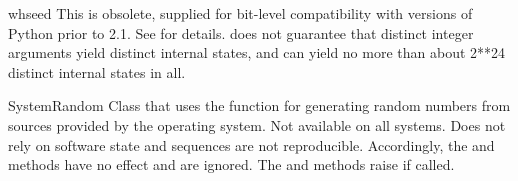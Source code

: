 \begin{funcdesc}{whseed}{}
  This is obsolete, supplied for bit-level compatibility with versions
  of Python prior to 2.1.
  See  for details.   does not guarantee
  that distinct integer arguments yield distinct internal states, and can
  yield no more than about 2**24 distinct internal states in all.
\end{funcdesc}

\begin{classdesc}{SystemRandom}{}
Class that uses the  function for generating
random numbers from sources provided by the operating system.
Not available on all systems.
Does not rely on software state and sequences are not reproducible.
Accordingly, the  and  methods
have no effect and are ignored.  The  and
 methods raise  if
called.
\end{classdesc}

\begin{seealso}
		  
\end{seealso}

